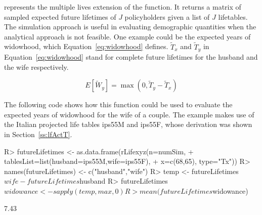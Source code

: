 \documentclass[nojss]{jss}
\begin{document}
 represents the multiple lives extension of the 
function. It returns a matrix of sampled expected future lifetimes of $J$
policyholders given a list of $J$ lifetables. The simulation approach is
useful in evaluating demographic quantities when the analytical approach is
not feasible.
One example could be the expected years of widowhood, which
Equation~\ref{eq:widowhood} defines. $\tilde T_x$ and $\tilde T_y$ in
Equation~\ref{eq:widowhood} stand for complete future lifetimes for 
the husband and the wife respectively.

\begin{equation}
E\left[ \tilde W_y \right] = \max \left( 0, \tilde T_y - \tilde T_x \right)
\label{eq:widowhood}
\end{equation}

The following code shows how this function could be used to 
evaluate the expected years of widowhood for the wife of a couple. The
example makes use of the Italian projected life tables ips55M and ips55F, whose
derivation was shown in Section~\ref{ss:lfActT}.


\begin{Schunk}
\begin{Sinput}
R> futureLifetimes <- as.data.frame(rLifexyz(n=numSim, 
+  				tablesList=list(husband=ips55M,wife=ips55F),
+  				x=c(68,65), type="Tx"))
R> names(futureLifetimes) <- c("husband","wife")
R> temp <- futureLifetimes$wife - futureLifetimes$husband
R> futureLifetimes$widowance  <-  sapply(temp, max,0)
R> mean(futureLifetimes$widowance)
\end{Sinput}
\begin{Soutput}
[1] 7.43
\end{Soutput}
\end{Schunk}
\end{document}
